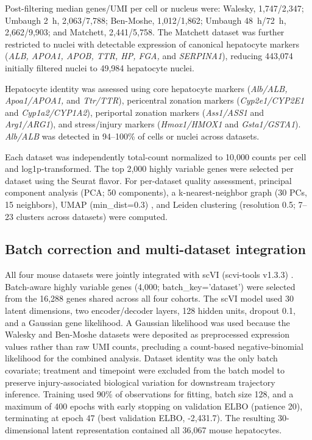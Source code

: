 Post-filtering median genes/UMI per cell or nucleus were: Walesky, 1,747/2,347; Umbaugh 2~h, 2,063/7,788; Ben-Moshe, 1,012/1,862; Umbaugh 48~h/72~h, 2,662/9,903; and Matchett, 2,441/5,758. The Matchett dataset was further restricted to nuclei with detectable expression of canonical hepatocyte markers (\textit{ALB, APOA1, APOB, TTR, HP, FGA,} and \textit{SERPINA1}), reducing 443,074 initially filtered nuclei to 49,984 hepatocyte nuclei.

Hepatocyte identity was assessed using core hepatocyte markers (\textit{Alb/ALB, Apoa1/APOA1,} and \textit{Ttr/TTR}), pericentral zonation markers (\textit{Cyp2e1/CYP2E1} and \textit{Cyp1a2/CYP1A2}), periportal zonation markers (\textit{Ass1/ASS1} and \textit{Arg1/ARG1}), and stress/injury markers (\textit{Hmox1/HMOX1} and \textit{Gsta1/GSTA1}). \textit{Alb/ALB} was detected in 94--100\% of cells or nuclei across datasets.

Each dataset was independently total-count normalized to 10,000 counts per cell and log1p-transformed. The top 2,000 highly variable genes were selected per dataset using the Seurat flavor. For per-dataset quality assessment, principal component analysis (PCA; 50 components), a k-nearest-neighbor graph (30 PCs, 15 neighbors), UMAP (min\_dist=0.3) \cite{ref110}, and Leiden clustering (resolution 0.5; 7--23 clusters across datasets) \cite{ref111} were computed.

\subsection*{Batch correction and multi-dataset integration}

All four mouse datasets were jointly integrated with scVI (scvi-tools v1.3.3) \cite{ref112,ref113}. Batch-aware highly variable genes (4,000; batch\_key='dataset') were selected from the 16,288 genes shared across all four cohorts. The scVI model used 30 latent dimensions, two encoder/decoder layers, 128 hidden units, dropout 0.1, and a Gaussian gene likelihood. A Gaussian likelihood was used because the Walesky and Ben-Moshe datasets were deposited as preprocessed expression values rather than raw UMI counts, precluding a count-based negative-binomial likelihood for the combined analysis. Dataset identity was the only batch covariate; treatment and timepoint were excluded from the batch model to preserve injury-associated biological variation for downstream trajectory inference. Training used 90\% of observations for fitting, batch size 128, and a maximum of 400 epochs with early stopping on validation ELBO (patience 20), terminating at epoch 47 (best validation ELBO, -2,431.7). The resulting 30-dimensional latent representation contained all 36,067 mouse hepatocytes.

